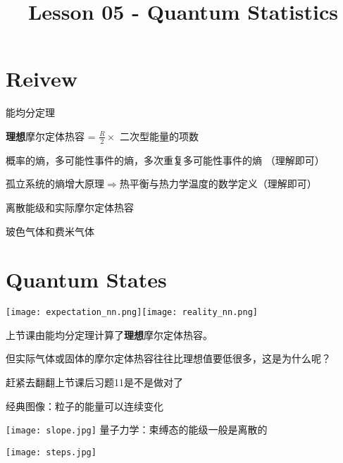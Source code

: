 \documentclass[CJK]{beamer}
\title{Lesson 05 - Quantum Statistics}
\author{}
\date{}
\begin{document}

\section{Reivew}

\begin{frame}
\bch
\bitem
\item{能均分定理}
\item{{\bf 理想}摩尔定体热容 = $\frac{R}{2}\times$ 二次型能量的项数}
\item{概率的熵，多可能性事件的熵，多次重复多可能性事件的熵 （理解即可）}
\item{孤立系统的熵增大原理$\Rightarrow$热平衡与热力学温度的数学定义（理解即可）}
\eitem
\ech
\end{frame}


\begin{frame}
\bch
\bitem
\item{离散能级和实际摩尔定体热容}
\item{玻色气体和费米气体}
\eitem
\ech
\end{frame}

\section{Quantum States}

\begin{frame}
\bch
\texttt{[image: expectation\_nn.png]}\texttt{[image: reality\_nn.png]}
\ech
\end{frame}

\begin{frame}
\bch
上节课由能均分定理计算了{\bf 理想}摩尔定体热容。

但实际气体或固体的摩尔定体热容往往比理想值要低很多，这是为什么呢？



\skipline

赶紧去翻翻上节课后习题11是不是做对了\bye

\ech
\end{frame}


\begin{frame}
\bch
{}
经典图像：粒子的能量可以连续变化 

\texttt{[image: slope.jpg]}
\emini
\hspace{0.2in}
量子力学：束缚态的能级一般是离散的

 \texttt{[image: steps.jpg]}  
\emini
\ech
\end{frame}
\end{document}
